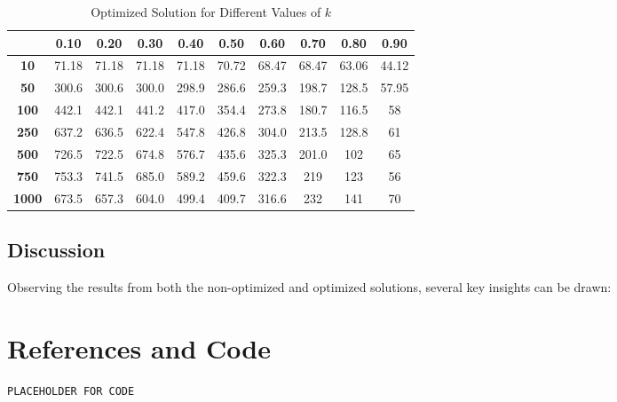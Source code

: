 \documentclass[12pt,a4paper]{article}
\begin{document}
\begin{table}[h!]
    \centering
    \setlength{\arrayrulewidth}{0.5mm} %
    \renewcommand{\arraystretch}{1.5} %
    \begin{tabular}{|c|c|c|c|c|c|c|c|c|c|}
    \hline
    \rowcolor{black!75} %
    & \color{white}\textbf{0.10} & \color{white}\textbf{0.20} & \color{white}\textbf{0.30} & \color{white}\textbf{0.40} & \color{white}\textbf{0.50} & \color{white}\textbf{0.60} & \color{white}\textbf{0.70} & \color{white}\textbf{0.80} & \color{white}\textbf{0.90} \\ \hline
    \cellcolor{black!75}\color{white}\textbf{10}   & 71.18 & 71.18 & 71.18 & 71.18 & 70.72 & 68.47 & 68.47 & 63.06 & 44.12 \\ \hline
    \cellcolor{black!75}\color{white}\textbf{50}    & 300.6 & 300.6 & 300.0 & 298.9 & 286.6 & 259.3 & 198.7 & 128.5 & 57.95 \\ \hline
    \cellcolor{black!75}\color{white}\textbf{100}   & 442.1 & 442.1 & 441.2 & 417.0 & 354.4 & 273.8 & 180.7 & 116.5 & 58 \\ \hline
    \cellcolor{black!75}\color{white}\textbf{250}   & 637.2 & 636.5 & 622.4 & 547.8 & 426.8 & 304.0 & 213.5 & 128.8 & 61 \\ \hline
    \cellcolor{black!75}\color{white}\textbf{500}   & 726.5 & 722.5 & 674.8 & 576.7 & 435.6 & 325.3 & 201.0 & 102 & 65 \\ \hline
    \cellcolor{black!75}\color{white}\textbf{750}   & 753.3 & 741.5 & 685.0 & 589.2 & 459.6 & 322.3 & 219 & 123 & 56 \\ \hline
    \cellcolor{black!75}\color{white}\textbf{1000}  & 673.5 & 657.3 & 604.0 & 499.4 & 409.7 & 316.6 & 232 & 141 & 70 \\ \hline
    \end{tabular}
    \caption{Optimized Solution for Different Values of $k$}
\end{table}

\newpage
\subsection{Discussion}
Observing the results from both the non-optimized and optimized solutions, several key insights can be drawn:

\newpage
\section{References and Code}

\begin{lstlisting}[style=Matlab-Pyglike]
PLACEHOLDER FOR CODE
\end{lstlisting}
\end{document}
